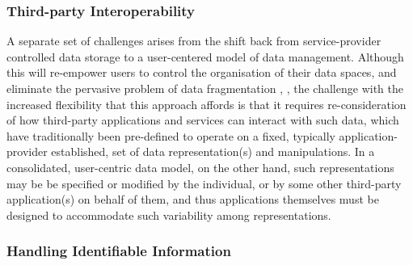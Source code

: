 \documentclass{acm_proc_article-sp}
\begin{document}

\subsubsection{Third-party Interoperability}

A separate set of challenges arises from the shift back from service-provider controlled data storage to a user-centered model of data management. Although this will re-empower users to control the organisation of their data spaces, and eliminate the pervasive problem of data fragmentation \cite{karger2006data}, \cite{heath2011linked}, the challenge with the increased flexibility that this approach affords is that it requires re-consideration of how third-party applications and services can interact with such data, which have traditionally been pre-defined to operate on a fixed, typically application-provider established, set of data representation(s) and manipulations.  In a consolidated, user-centric data model, on the other hand, such representations may be be specified or modified by the individual, or by some other third-party application(s) on behalf of them, and thus applications themselves must be designed to accommodate such variability among representations.

\subsubsection{Handling Identifiable Information}
\end{document}

